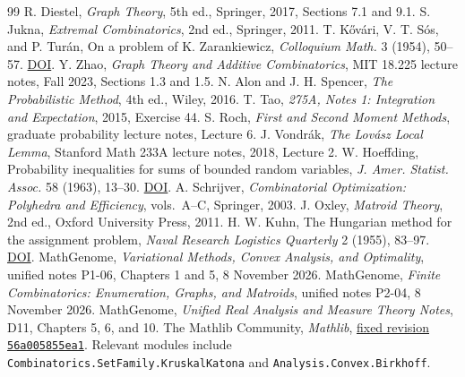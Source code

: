 \documentclass[11pt,oneside,openany]{book}
\theoremstyle{plain}
\theoremstyle{definition}
\theoremstyle{remark}
\begin{document}
\backmatter
\begin{thebibliography}{99}
 R. Diestel, \emph{Graph Theory}, 5th ed.,
  Springer, 2017, Sections 7.1 and 9.1.
 S. Jukna, \emph{Extremal Combinatorics}, 2nd ed.,
  Springer, 2011.
 T. K\H{o}v\'ari, V. T. S\'os, and P. Tur\'an,
  On a problem of K. Zarankiewicz, \emph{Colloquium Math.} 3
  (1954), 50--57.
  \href{https://doi.org/10.4064/cm-3-1-50-57}{DOI}.
 Y. Zhao, \emph{Graph Theory and Additive
  Combinatorics}, MIT 18.225 lecture notes, Fall 2023,
  Sections 1.3 and 1.5.
 N. Alon and J. H. Spencer,
  \emph{The Probabilistic Method}, 4th ed., Wiley, 2016.
 T. Tao, \emph{275A, Notes 1: Integration and
  Expectation}, 2015, Exercise 44.
 S. Roch, \emph{First and Second Moment Methods},
  graduate probability lecture notes, Lecture 6.
 J. Vondr\'ak, \emph{The Lov\'asz Local Lemma},
  Stanford Math 233A lecture notes, 2018, Lecture 2.
 W. Hoeffding, Probability inequalities for sums
  of bounded random variables, \emph{J. Amer. Statist. Assoc.} 58
  (1963), 13--30.
  \href{https://doi.org/10.1080/01621459.1963.10500830}{DOI}.
 A. Schrijver, \emph{Combinatorial Optimization:
  Polyhedra and Efficiency}, vols.~A--C, Springer, 2003.
 J. Oxley, \emph{Matroid Theory}, 2nd ed.,
  Oxford University Press, 2011.
 H. W. Kuhn, The Hungarian method for the assignment
  problem, \emph{Naval Research Logistics Quarterly} 2 (1955), 83--97.
  \href{https://doi.org/10.1002/nav.3800020109}{DOI}.
 MathGenome, \emph{Variational Methods, Convex
  Analysis, and Optimality}, unified notes P1-06, Chapters 1 and 5,
  8 November 2026.
 MathGenome, \emph{Finite Combinatorics:
  Enumeration, Graphs, and Matroids}, unified notes P2-04,
  8 November 2026.
 MathGenome, \emph{Unified Real Analysis and Measure
  Theory Notes}, D11, Chapters 5, 6, and 10.
 The Mathlib Community, \emph{Mathlib},
  \href{https://github.com/leanprover-community/mathlib4/tree/56a005855ea17e0b0958f73ec801ae140b0a1679}{fixed revision
  \texttt{56a005855ea1}}. Relevant modules include
  \texttt{Combinatorics.SetFamily.KruskalKatona} and
  \texttt{Analysis.Convex.Birkhoff}.
\end{thebibliography}
\end{document}
